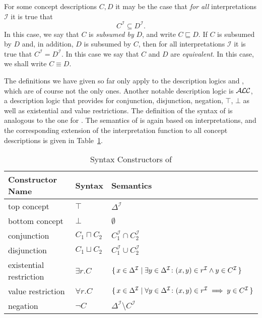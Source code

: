 For some \ELbot concept descriptions $C, D$ it may be the case that \emph{for all}
interpretations $\mathcal{I}$ it is true that
\begin{equation*}
  C^{\mathcal{I}} \subseteq D^{\mathcal{I}}.
\end{equation*}
In this case, we say that $C$ is \emph{subsumed by} $D$, and write $C \sqsubseteq D$.  If
$C$ is subsumed by $D$ and, in addition, $D$ is subsumed by $C$, then for all
interpretations $\mathcal{I}$ it is true that $C^{\mathcal{I}} = D^{\mathcal{I}}$.  In
this case we say that $C$ and $D$ are \emph{equivalent}.  In this case, we shall write $C
\equiv D$.

The definitions we have given so far only apply to the description logics \EL and \ELbot,
which are of course not the only ones.  Another notable description logic is $\mathcal{A}\kern-0.05em\mathcal{L}\mathcal{C}$, a
description logic that provides for conjunction, disjunction, negation, $\top$, $\bot$ as
well as existential and value restrictions.  The definition of the syntax of \ALC is
analogous to the one for \EL.  The semantics of \ALC is again based on interpretations,
and the corresponding extension of the interpretation function to all \ALC concept
descriptions is given in Table~\ref{tab:ALC-syntax}.

\begin{table}[tp]
  \centering
  \renewcommand{\arraystretch}{1.2}
  \begin{tabular}[c]{l l l}
    \toprule
    Constructor Name         & Syntax           & Semantics \\
    \midrule
    top concept              & $\top$           & $\Delta^{\mathcal{I}}$ \\
    bottom concept           & $\bot$           & $\emptyset$ \\
    conjunction              & $C_1 \sqcap C_2$ & $C_1^{\mathcal{I}} \cap C_2^{\mathcal{I}}$ \\
    disjunction              & $C_1 \sqcup C_2$ & $C_1^{\mathcal{I}} \cup C_2^{\mathcal{I}}$ \\
    existential restriction  & $\exists r. C$   & ${\{\, x \in \Delta^{\mathcal{I}} \mid
      \exists y \in \Delta^{\mathcal{I}} \colon (x, y) \in r^{\mathcal{I}} \land y \in
      C^{\mathcal{I}} \,\}}$ \\
    value restriction        & $\forall r. C$   & ${\{\, x \in \Delta^{\mathcal{I}} \mid
      \forall y \in \Delta^{\mathcal{I}} \colon (x, y) \in r^{\mathcal{I}} \implies y \in
      C^{\mathcal{I}} \,\}}$ \\
    negation                 & $\neg C$         & $\Delta^{\mathcal{I}} \setminus
    C^{\mathcal{I}}$ \\
    \bottomrule
  \end{tabular}
  \caption{Syntax Constructors of \ALC}
  \label{tab:ALC-syntax}
\end{table}

